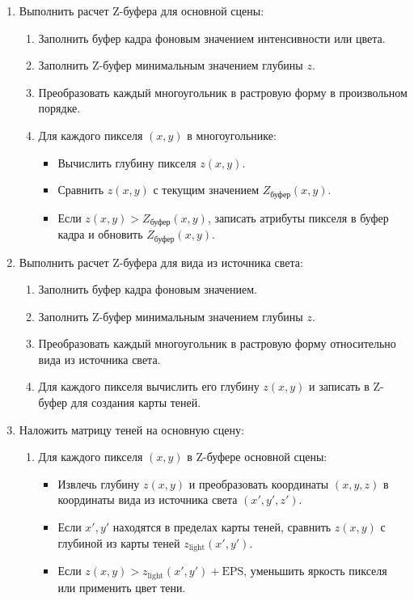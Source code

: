 \begin{enumerate}
    \item Выполнить расчет Z-буфера для основной сцены:
    \begin{enumerate}
        \item Заполнить буфер кадра фоновым значением интенсивности или цвета.
        \item Заполнить Z-буфер минимальным значением глубины \( z \).
        \item Преобразовать каждый многоугольник в растровую форму в произвольном порядке.
        \item Для каждого пикселя \( (x, y) \) в многоугольнике:
        \begin{itemize}
            \item Вычислить глубину пикселя \( z(x, y) \).
            \item Сравнить \( z(x, y) \) с текущим значением \( Z_{\text{буфер}}(x, y) \).
            \item Если \( z(x, y) > Z_{\text{буфер}}(x, y) \), записать атрибуты пикселя в буфер кадра и обновить \( Z_{\text{буфер}}(x, y) \).
        \end{itemize}
    \end{enumerate}

    \item Выполнить расчет Z-буфера для вида из источника света:
    \begin{enumerate}
        \item Заполнить буфер кадра фоновым значением.
        \item Заполнить Z-буфер минимальным значением глубины \( z \).
        \item Преобразовать каждый многоугольник в растровую форму относительно вида из источника света.
        \item Для каждого пикселя вычислить его глубину \( z(x, y) \) и записать в Z-буфер для создания карты теней.
    \end{enumerate}

    \item Наложить матрицу теней на основную сцену:
    \begin{enumerate}
        \item Для каждого пикселя \( (x, y) \) в Z-буфере основной сцены:
        \begin{itemize}
            \item Извлечь глубину \( z(x, y) \) и преобразовать координаты \( (x, y, z) \) в координаты вида из источника света \( (x', y', z') \).
            \item Если \( x', y' \) находятся в пределах карты теней, сравнить \( z(x, y) \) с глубиной из карты теней \( z_{\text{light}}(x', y') \).
            \item Если \( z(x, y) > z_{\text{light}}(x', y') + \text{EPS} \), уменьшить яркость пикселя или применить цвет тени.
        \end{itemize}
    \end{enumerate}
\end{enumerate}

